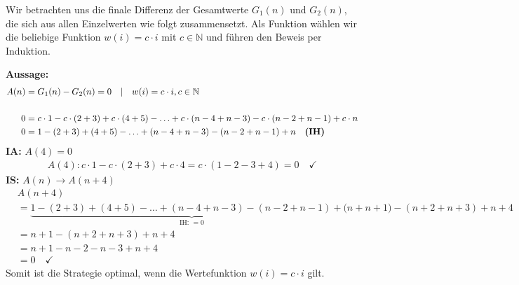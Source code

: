 \documentclass{article}
\DeclarePairedDelimiter\floor{\lfloor}{\rfloor}
\begin{document}
\begin{enumerate}
        Wir betrachten uns die finale Differenz der Gesamtwerte $G_1(n)$ und $G_2(n)$, die sich aus allen Einzelwerten wie folgt zusammensetzt. Als Funktion wählen wir die beliebige Funktion $w(i) = c\cdot i$ mit $c \in \mathbb{N}$ und führen den Beweis per Induktion.
    
        \textbf{Aussage:}
        \begin{align*}
            A(n)&= G_1(n) - G_2(n) =0 \quad | \quad w(i) = c\cdot i, c \in \mathbb{N}\\\\
            0&= c\cdot 1 - c \cdot (2+3) + c \cdot (4+5) - \ldots + c \cdot (n-4 + n-3) - c \cdot (n-2+n-1) + c \cdot n \\
            0&= 1 - (2+3) + (4+5) - \ldots + (n-4 + n-3) - (n-2+n-1) + n \quad \text{\textbf{(IH)}}
        \end{align*} 
        \textbf{IA:} $A(4)=0$
        \begin{align*}
            A(4): c\cdot 1 - c \cdot (2+3) + c \cdot 4 = c \cdot (1-2-3+4) = 0 \quad \checkmark
        \end{align*}
        \textbf{IS:} $A(n) \rightarrow A(n+4)$
        \begin{align*}
            &A(n+4) \\
            &= \underbrace{1 - (2+3) + (4+5) - \ldots + (n-4 + n-3) - (n-2+n-1) + (n}_{\text{IH: } =0} + n+1) - (n+2 +n+3)+n+4 \\
            &= n+1-(n+2+n+3)+n+4 \\
            &= n+1-n-2-n-3+n+4 \\
            &= 0 \quad \checkmark
        \end{align*}
        Somit ist die Strategie optimal, wenn die Wertefunktion $w(i) = c\cdot i$ gilt. 
    \end{enumerate}
\end{document}
